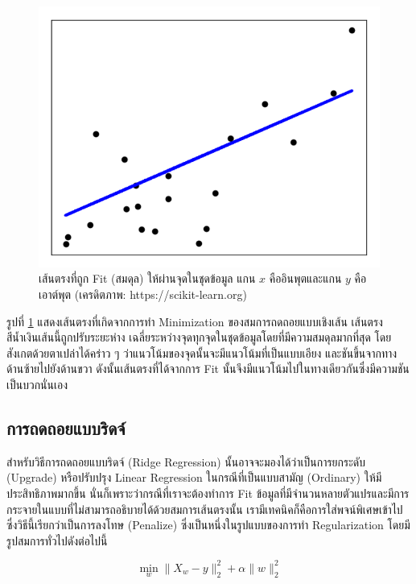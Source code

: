 \begin{figure}[H]
    \centering
    \includegraphics[width=0.9\linewidth]{fig/plot_linear_regression.png}
    \caption{เส้นตรงที่ถูก Fit (สมดุล) ให้ผ่านจุดในชุดข้อมูล แกน $x$ คืออินพุตและแกน $y$ คือเอาต์พุต (เครดิตภาพ:
        https://scikit-learn.org)}
    \label{fig:lin_res}
\end{figure}

รูปที่ \ref{fig:lin_res} แสดงเส้นตรงที่เกิดจากการทำ Minimization ของสมการถดถอยแบบเชิงเส้น เส้นตรงสีน้ำเงินเส้นนี้ถูกปรับระยะห่าง%
เฉลี่ยระหว่างจุดทุกจุดในชุดข้อมูลโดยที่มีความสมดุลมากที่สุด โดยสังเกตด้วยตาเปล่าได้คร่าว ๆ ว่าแนวโน้มของจุดนั้นจะมีแนวโน้มที่เป็นแบบเอียง%
และชันขึ้นจากทางด้านซ้ายไปยังด้านขวา ดังนั้นเส้นตรงที่ได้จากการ Fit นั้นจึงมีแนวโน้มไปในทางเดียวกันซึ่งมีความชันเป็นบวกนั่นเอง

\subsection{การถดถอยแบบริดจ์}
\label{ssec:ridge_reg}

สำหรับวิธีการถดถอยแบบริดจ์ (Ridge Regression) นั้นอาจจะมองได้ว่าเป็นการยกระดับ (Upgrade) หรือปรับปรุง Linear Regression
ในกรณีที่เป็นแบบสามัญ (Ordinary) ให้มีประสิทธิภาพมากขึ้น นั่นก็เพราะว่ากรณีที่เราจะต้องทำการ Fit ข้อมูลที่มีจำนวนหลายตัวแปรและมีการ%
กระจายในแบบที่ไม่สามารถอธิบายได้ด้วยสมการเส้นตรงนั้น เรามีเทคนิคก็คือการใส่พจน์พิเศษเข้าไป ซึ่งวิธีนี้เรียกว่าเป็นการลงโทษ (Penalize)
ซึ่งเป็นหนึ่งในรูปแบบของการทำ Regularization โดยมีรูปสมการทั่วไปดังต่อไปนี้

\begin{equation}
    \min_{w} \lVert X_{w} - y \rVert_{2}^{2} + \alpha \lVert w \rVert_{2}^{2}
\end{equation}

